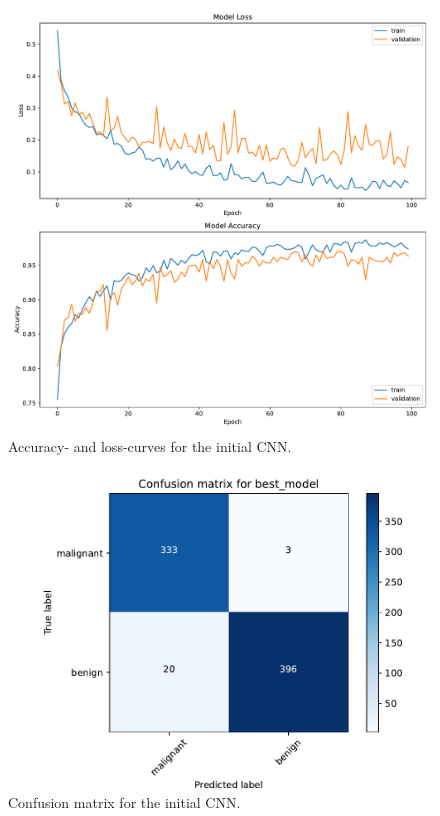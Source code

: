 \begin{figure}[H]
    \centering
    \includegraphics[width=.7\textwidth]{plots/history.pdf}
    \caption{Accuracy- and loss-curves for the initial CNN.}
    \label{fig:learningCurveFinal}
\end{figure}


\begin{figure}[H]
    \centering
    \includegraphics[width=.5\textwidth]{plots/confusion_matrix_best_model.pdf}
    \caption{Confusion matrix for the initial CNN.}
    \label{fig:confusionMatrixFinal}
\end{figure}